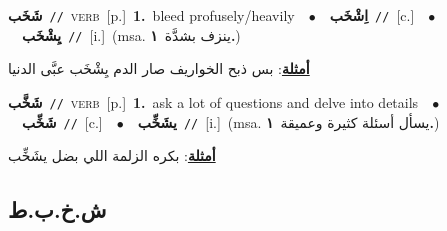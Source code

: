 \documentclass[10pt,a4paper,twoside]{article} %
\begin{document}
\begin{multicols}{2}
{\setlength\topsep{0pt}\textbf{\foreignlanguage{arabic}{شَخَب}}\ {\color{gray}\texttt{//}\color{black}}\ \textsc{verb}\ [p.]\ \textbf{1.}~bleed profusely/heavily\ \ $\bullet$\ \ \setlength\topsep{0pt}\textbf{\foreignlanguage{arabic}{اِشْخَب}}\ {\color{gray}\texttt{//}\color{black}}\ [c.]\ \ $\bullet$\ \ \setlength\topsep{0pt}\textbf{\foreignlanguage{arabic}{يِشْخَب}}\ {\color{gray}\texttt{//}\color{black}}\ [i.]\ \color{gray}(msa. \foreignlanguage{arabic}{ينزف بشدَّة}~\foreignlanguage{arabic}{\textbf{١.}})\color{black}\  \begin{flushright}\color{gray}\foreignlanguage{arabic}{\textbf{\underline{\foreignlanguage{arabic}{أمثلة}}}: بس ذبح الخواريف صار الدم يِشْخَب عبَّى الدنيا}\end{flushright}\color{black}} \vspace{2mm}

{\setlength\topsep{0pt}\textbf{\foreignlanguage{arabic}{شَخَّب}}\ {\color{gray}\texttt{//}\color{black}}\ \textsc{verb}\ [p.]\ \textbf{1.}~ask a lot of questions and delve into details\ \ $\bullet$\ \ \setlength\topsep{0pt}\textbf{\foreignlanguage{arabic}{شَخِّب}}\ {\color{gray}\texttt{//}\color{black}}\ [c.]\ \ $\bullet$\ \ \setlength\topsep{0pt}\textbf{\foreignlanguage{arabic}{يشَخِّب}}\ {\color{gray}\texttt{//}\color{black}}\ [i.]\ \color{gray}(msa. \foreignlanguage{arabic}{يسأل أسئلة كثيرة وعميقة}~\foreignlanguage{arabic}{\textbf{١.}})\color{black}\  \begin{flushright}\color{gray}\foreignlanguage{arabic}{\textbf{\underline{\foreignlanguage{arabic}{أمثلة}}}: بكره الزلمة اللي بضل يشَخِّب}\end{flushright}\color{black}} \vspace{2mm}

\vspace{-3mm}
\subsection*{\color{blue}\foreignlanguage{arabic}{ش.خ.ب.ط}\color{blue}{}} 


\end{multicols}
\end{document}

